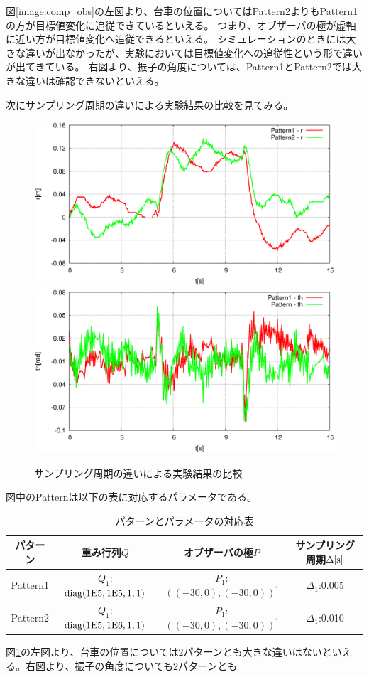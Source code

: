 	図\ref{image:comp_obs}の左図より、台車の位置についてはPattern2よりもPattern1の方が目標値変化に追従できているといえる。
	つまり、オブザーバの極が虚軸に近い方が目標値変化へ追従できるといえる。
	シミュレーションのときには大きな違いが出なかったが、実験においては目標値変化への追従性という形で違いが出てきている。
	右図より、振子の角度については、Pattern1とPattern2では大きな違いは確認できないといえる。
	\par
	次にサンプリング周期の違いによる実験結果の比較を見てみる。
	\begin{figure}[H]
		\centering
		\includegraphics[width=0.4\linewidth]{gazo/Compare_dt_R.eps}
		\includegraphics[width=0.4\linewidth]{gazo/Compare_dt_TH.eps}
		\caption{サンプリング周期の違いによる実験結果の比較}
		\label{image:comp_dt}
	\end{figure}
	図中のPatternは以下の表に対応するパラメータである。
	\begin{table}[H]
		\begin{center}
			\caption{パターンとパラメータの対応表}
			\medskip
			
			\begin{tabular}{|c|c|c|c|}\hline
				パターン & 重み行列$Q$ & オブザーバの極$P$ & サンプリング周期$\Delta[\rm{s}]$ \\ \hline\hline
				Pattern1 & $Q_1$:$\rm{diag}(1E5,1E5,1,1)$ & $P_1$:$((-30,0),(-30,0))^{'}$ & $\Delta_1$:0.005 \\ \hline
				Pattern2 & $Q_1$:$\rm{diag}(1E5,1E6,1,1)$ & $P_1$:$((-30,0),(-30,0))^{'}$ & $\Delta_1$:0.010 \\ \hline
			\end{tabular}
		\end{center}
		\label{table:huriage_control}
	\end{table}
	図\ref{image:comp_dt}の左図より、台車の位置については2パターンとも大きな違いはないといえる。右図より、振子の角度についても2パターンとも
